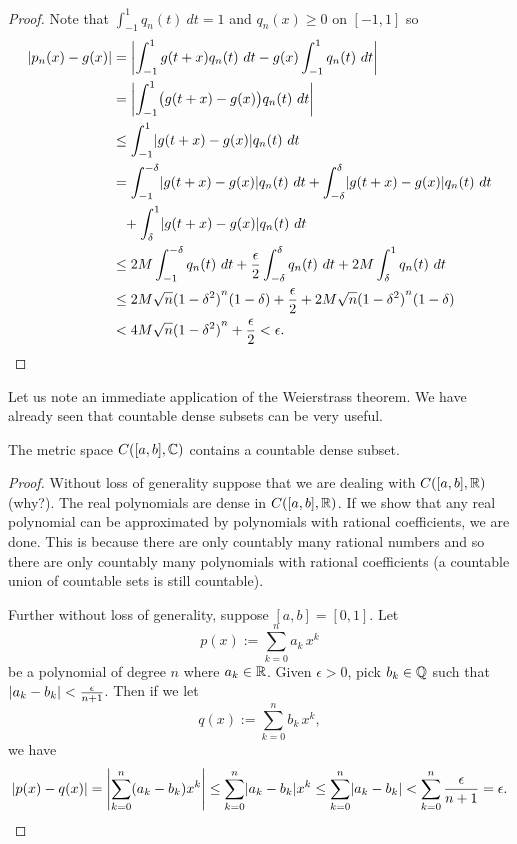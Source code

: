 \begin{proof}
Note that 
$\int_{-1}^1 q_n(t) ~ dt = 1$ and $q_n(x) \geq 0$ on $[-1,1]$ so
\begin{equation*}
\begin{split}
\lvert {p_n(x)-g(x)} \rvert & =
\left\lvert {\int_{-1}^1 g(t+x)q_n(t) ~ dt
-g(x)\int_{-1}^1 q_n(t) ~ dt} \right\rvert \\
& =
\left\lvert {\int_{-1}^1 \bigl(g(t+x)-g(x)\bigr)q_n(t) ~ dt} \right\rvert \\
& \leq
\int_{-1}^1 \lvert {g(t+x)-g(x)} \rvert q_n(t) ~ dt \\
& =
\int_{-1}^{-\delta} \lvert {g(t+x)-g(x)} \rvert q_n(t) ~ dt
+
\int_{-\delta}^{\delta} \lvert {g(t+x)-g(x)} \rvert q_n(t) ~ dt
\\
& \phantom{\leq} +
\int_{\delta}^1 \lvert {g(t+x)-g(x)} \rvert q_n(t) ~ dt \\
& \leq
2M
\int_{-1}^{-\delta} q_n(t) ~ dt
+
\frac{\epsilon}{2}
\int_{-\delta}^{\delta} q_n(t) ~ dt
+
2M
\int_{\delta}^1 q_n(t) ~ dt \\
& \leq
2M\sqrt{n}{(1-\delta^2)}^n(1-\delta)
+
\frac{\epsilon}{2}
+
2M\sqrt{n}{(1-\delta^2)}^n(1-\delta) \\
& <
4M\sqrt{n}{(1-\delta^2)}^n
+
\frac{\epsilon}{2}
< \epsilon . \qedhere
\end{split}
\end{equation*}
\end{proof}

Let us note an immediate application of the Weierstrass theorem.  We have
already seen that countable dense subsets can be very useful.

\begin{cor}
The metric space $C([a,b],{\mathbb{C}})$ contains a countable dense subset.
\end{cor}

\begin{proof}
Without loss of generality suppose that we are dealing with $C([a,b],{\mathbb{R}})$
(why?).
The real polynomials are dense in $C([a,b],{\mathbb{R}})$.  If we show that
any real polynomial can be approximated by polynomials with rational
coefficients, we are done.  This is because there are only countably many
rational numbers and so there are only countably many polynomials with
rational coefficients (a countable union of countable sets is still
countable).

Further without loss of generality, suppose $[a,b]=[0,1]$.  Let
\begin{equation*}
p(x) := \sum_{k=0}^n a_k\,  x^k
\end{equation*}
be a polynomial of degree $n$ where $a_k \in {\mathbb{R}}$.  Given $\epsilon > 0$, pick $b_k \in {\mathbb{Q}}$
such that $\lvert {a_k-b_k} \rvert < \frac{\epsilon}{n+1}$.  Then
if we let
\begin{equation*}
q(x) := \sum_{k=0}^n b_k \, x^k ,
\end{equation*}
we have
\begin{equation*}
\lvert {p(x)-q(x)} \rvert
=
\left\lvert {\sum_{k=0}^n (a_k-b_k) x^k} \right\rvert
\leq
\sum_{k=0}^n \lvert {a_k-b_k} \rvert x^k
\leq
\sum_{k=0}^n \lvert {a_k-b_k} \rvert
<
\sum_{k=0}^n \frac{\epsilon}{n+1} = \epsilon . \qedhere
\end{equation*}
\end{proof}

